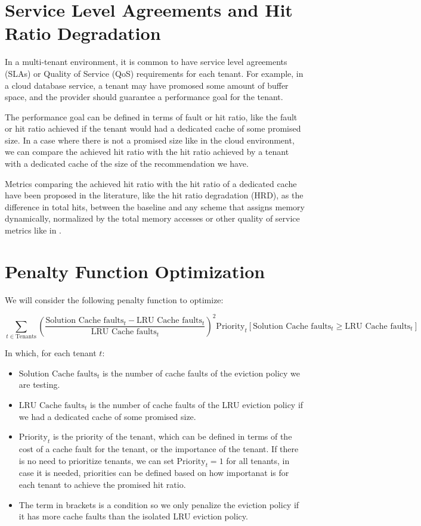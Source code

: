 \section{Service Level Agreements and Hit Ratio Degradation}

In a multi-tenant environment, it is common to have service level agreements (SLAs)
or Quality of Service (QoS) requirements for each tenant. For example, in a cloud 
database service, a tenant may have promosed some amount of buffer space, and the
provider should guarantee a performance goal for the tenant.

The performance goal can be defined in terms of fault or hit ratio, like the fault
or hit ratio achieved if the tenant would had a dedicated cache of some promised size.
In a case where there is not a promised size like in the cloud environment, we can 
compare the achieved hit ratio with the hit ratio achieved by a tenant with a dedicated
cache of the size of the recommendation we have.

Metrics comparing the achieved hit ratio with the hit ratio of a dedicated cache have
been proposed in the literature, like the hit ratio degradation (HRD), as the difference 
in total hits, between the baseline and any scheme that assigns memory dynamically, 
normalized by the total memory accesses \cite{buffer-sharing-1} or other quality of 
service metrics like in \cite{learning-based-prediction}.

\section{Penalty Function Optimization}

We will consider the following penalty function to optimize:

$$
\sum_{t \in \text{Tenants}} \left( \frac{\text{Solution Cache faults}_t - \text{LRU Cache faults}_t}{\text{LRU Cache faults}_t} \right) ^2 \text{Priority}_t \left[\text{Solution Cache faults}_t \geq \text{LRU Cache faults}_t\right]
$$

In which, for each tenant $t$:
\begin{itemize}
    \item $\text{Solution Cache faults}_t$ is the number of cache faults of the eviction policy we are testing.
    \item $\text{LRU Cache faults}_t$ is the number of cache faults of the LRU eviction policy if we had a dedicated cache of some promised size.
    \item $\text{Priority}_t$ is the priority of the tenant, which can be defined in terms of the cost of a cache fault for the tenant, or the importance of the tenant. If there is no need to prioritize tenants, we can set $\text{Priority}_t = 1$ for all tenants, in case it is needed, priorities can be defined based on how importanat is for each tenant to achieve the promised hit ratio.
    \item The term in brackets is a condition so we only penalize the eviction policy if it has more cache faults than the isolated LRU eviction policy.
\end{itemize}

